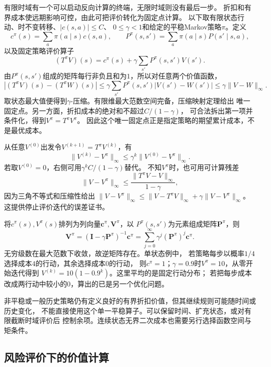 有限时域有一个可以启动反向计算的终端，无限时域则没有最后一步。
折扣和有界成本使远期影响可控，由此可把评价转化为固定点计算。
以下取有限状态行动、时不变转移、$|c(s,a)|\leq C$、
$0\leq\gamma<1$和给定的平稳Markov策略$\pi$。定义
\[
  c^\pi(s)=\sum_a\pi(a\mid s)c(s,a),\qquad
  P^\pi(s,s')=\sum_a\pi(a\mid s)P(s'\mid s,a),
\]
以及固定策略评价算子
\begin{equation}
  (T^\pi V)(s)=c^\pi(s)+\gamma\sum_{s'}P^\pi(s,s')V(s').
  \label{eq:policy-discounted-evaluation-operator}
\end{equation}
由$P^\pi(s,s')$组成的矩阵每行非负且和为$1$，所以对任意两个价值函数，
\[
  |(T^\pi V)(s)-(T^\pi W)(s)|
  \leq\gamma\sum_{s'}P^\pi(s,s')|V(s')-W(s')|
  \leq\gamma\lVert V-W\rVert_\infty.
\]
取状态最大值便得到$\gamma$-压缩。有限维最大范数空间完备，压缩映射定理给出
唯一固定点。另一方面，折扣成本的绝对和不超过$C/(1-\gamma)$，
可合法拆出第一项并条件化，得到$V^\pi=T^\pi V^\pi$。
因此这个唯一固定点正是指定策略的期望累计成本，不是最优成本。

从任意$V^{(0)}$出发令$V^{(k+1)}=T^\pi V^{(k)}$，有
\begin{equation}
  \lVert V^{(k)}-V^\pi\rVert_\infty
  \leq\gamma^k\lVert V^{(0)}-V^\pi\rVert_\infty.
  \label{eq:policy-evaluation-iteration-error}
\end{equation}
若取$V^{(0)}=0$，右侧可用$\gamma^kC/(1-\gamma)$替代。
不知$V^\pi$时，也可用可计算残差
\[
  \lVert V-V^\pi\rVert_\infty
  \leq\frac{\lVert T^\pi V-V\rVert_\infty}{1-\gamma},
\]
因为三角不等式和压缩性给出
$\lVert V-V^\pi\rVert_\infty\leq
\lVert V-T^\pi V\rVert_\infty+\gamma\lVert V-V^\pi\rVert_\infty$。
这提供停止评价迭代的误差证书。

将$c^\pi(s),V^\pi(s)$排列为列向量$\bm c^\pi,\bm V^\pi$，以
$P^\pi(s,s')$为元素组成矩阵$\bm P^\pi$，则
\[
  \bm V^\pi=(\bm I-\gamma\bm P^\pi)^{-1}\bm c^\pi
  =\sum_{j=0}^\infty\gamma^j(\bm P^\pi)^j\bm c^\pi.
\]
无穷级数在最大范数下收敛，故逆矩阵存在。单状态例中，
若策略每步以概率$1/4$选择成本$4$的行动，其余选择成本$0$的行动，
则$c^\pi=1$；$\gamma=0.9$时$V^\pi=10$，从零开始迭代得到
$V^{(k)}=10(1-0.9^k)$。这里平均的是固定行动分布；
若把每步成本改成两行动中较小的$0$，算出的已是另一个优化问题。

非平稳或一般历史策略仍有定义良好的有界折扣价值，但其继续规则可能随时间或历史变化，
不能直接使用这个单一平稳算子。可以保留时间、扩充状态，或对有限截断时域评价后
控制余项。连续状态无界二次成本也需要另行选择函数空间与矩条件。

\subsection{风险评价下的价值计算}

